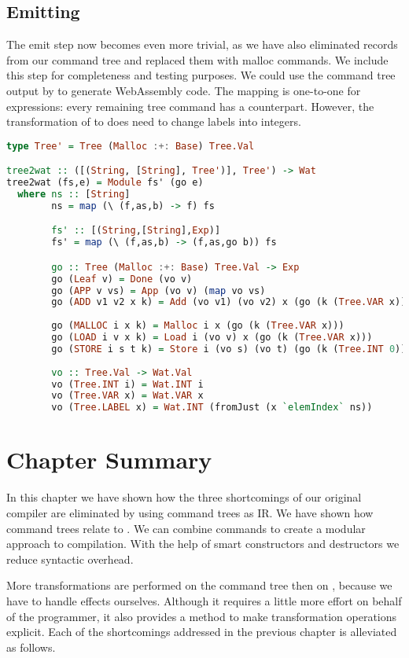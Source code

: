 \subsection{\label{subsection:emit2}Emitting}
The emit step now becomes even more trivial, as we have also eliminated records from our command tree and replaced them with malloc commands. We include this step for completeness and testing purposes. We could use the command tree output by  to generate WebAssembly code. The mapping is one-to-one for expressions: every remaining tree command has a  counterpart. However, the transformation of  to  does need to change labels into integers.

\begin{lstlisting}[language=Haskell]
type Tree' = Tree (Malloc :+: Base) Tree.Val

tree2wat :: ([(String, [String], Tree')], Tree') -> Wat
tree2wat (fs,e) = Module fs' (go e)
  where ns :: [String]
        ns = map (\ (f,as,b) -> f) fs

        fs' :: [(String,[String],Exp)]
        fs' = map (\ (f,as,b) -> (f,as,go b)) fs

        go :: Tree (Malloc :+: Base) Tree.Val -> Exp
        go (Leaf v) = Done (vo v)
        go (APP v vs) = App (vo v) (map vo vs)
        go (ADD v1 v2 x k) = Add (vo v1) (vo v2) x (go (k (Tree.VAR x)))
        
        go (MALLOC i x k) = Malloc i x (go (k (Tree.VAR x)))
        go (LOAD i v x k) = Load i (vo v) x (go (k (Tree.VAR x)))
        go (STORE i s t k) = Store i (vo s) (vo t) (go (k (Tree.INT 0)))
        
        vo :: Tree.Val -> Wat.Val
        vo (Tree.INT i) = Wat.INT i
        vo (Tree.VAR x) = Wat.VAR x
        vo (Tree.LABEL x) = Wat.INT (fromJust (x `elemIndex` ns))
\end{lstlisting}

\section{\label{section:summarytree}Chapter Summary}
In this chapter we have shown how the three shortcomings of our original compiler are eliminated by using command trees as IR. We have shown how command trees relate to . We can combine commands to create a modular approach to compilation. With the help of smart constructors and destructors we reduce syntactic overhead.

More transformations are performed on the command tree then on , because we have to handle effects ourselves. Although it requires a little more effort on behalf of the programmer, it also provides a method to make transformation operations explicit. Each of the shortcomings addressed in the previous chapter is alleviated as follows.


